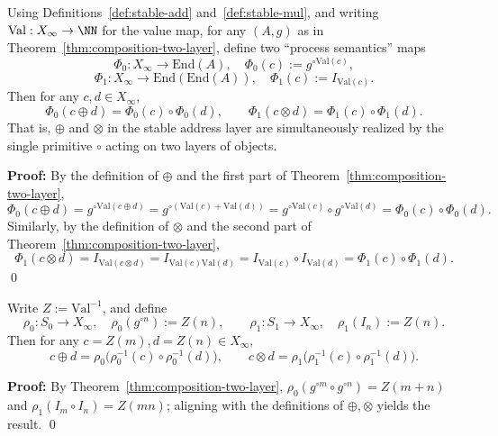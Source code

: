 \begin{theorem}\label{thm:arith-composition}
Using Definitions~\ref{def:stable-add} and~\ref{def:stable-mul}, and writing $\mathrm{Val}:X_\infty\to\NN$ for the value map, for any $(A,g)$ as in Theorem~\ref{thm:composition-two-layer}, define two ``process semantics'' maps
\[
\Phi_0:X_\infty\to \mathrm{End}(A),\quad \Phi_0(c):=g^{\circ\mathrm{Val}(c)},
\]
\[
\Phi_1:X_\infty\to \mathrm{End}(\mathrm{End}(A)),\quad \Phi_1(c):=I_{\mathrm{Val}(c)}.
\]
Then for any $c,d\in X_\infty$,
\[
\Phi_0(c\oplus d)=\Phi_0(c)\circ\Phi_0(d),\qquad
\Phi_1(c\otimes d)=\Phi_1(c)\circ\Phi_1(d).
\]
That is, $\oplus$ and $\otimes$ in the stable address layer are simultaneously realized by the single primitive $\circ$ acting on two layers of objects.
\end{theorem}

\textbf{Proof:}
By the definition of $\oplus$ and the first part of Theorem~\ref{thm:composition-two-layer},
\[
\Phi_0(c\oplus d)=g^{\circ\mathrm{Val}(c\oplus d)}
=g^{\circ(\mathrm{Val}(c)+\mathrm{Val}(d))}
 =g^{\circ\mathrm{Val}(c)}\circ g^{\circ\mathrm{Val}(d)}
=\Phi_0(c)\circ\Phi_0(d).
\]
Similarly, by the definition of $\otimes$ and the second part of Theorem~\ref{thm:composition-two-layer},
\[
\Phi_1(c\otimes d)=I_{\mathrm{Val}(c\otimes d)}
=I_{\mathrm{Val}(c)\mathrm{Val}(d)}
=I_{\mathrm{Val}(c)}\circ I_{\mathrm{Val}(d)}
=\Phi_1(c)\circ\Phi_1(d).
\]
\qed

\begin{corollary}\label{cor:composition-pullback}
Write $Z:=\mathrm{Val}^{-1}$, and define
\[
\rho_0:S_0\to X_\infty,\quad \rho_0(g^{\circ n}):=Z(n),\qquad
\rho_1:S_1\to X_\infty,\quad \rho_1(I_n):=Z(n).
\]
Then for any $c=Z(m),d=Z(n)\in X_\infty$,
\[
c\oplus d=\rho_0\bigl(\rho_0^{-1}(c)\circ \rho_0^{-1}(d)\bigr),
\qquad
c\otimes d=\rho_1\bigl(\rho_1^{-1}(c)\circ \rho_1^{-1}(d)\bigr).
\]
\end{corollary}

\textbf{Proof:}
By Theorem~\ref{thm:composition-two-layer}, $\rho_0(g^{\circ m}\circ g^{\circ n})=Z(m+n)$ and $\rho_1(I_m\circ I_n)=Z(mn)$; aligning with the definitions of $\oplus,\otimes$ yields the result. \qed

